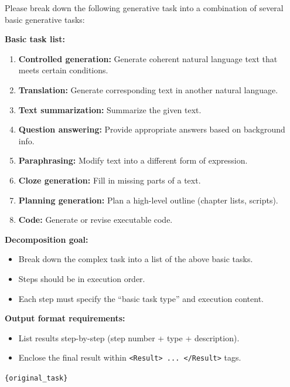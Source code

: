 \begin{tcolorbox}[title={\texttt{TASK\_DECOMP\_PROMPT}}, breakable, colframe=blue!50!black, colback=blue!5]
Please break down the following generative task into a combination of several basic generative tasks:

\textbf{Basic task list:}
\begin{enumerate}
    \item \textbf{Controlled generation:} Generate coherent natural language text that meets certain conditions.
    \item \textbf{Translation:} Generate corresponding text in another natural language.
    \item \textbf{Text summarization:} Summarize the given text.
    \item \textbf{Question answering:} Provide appropriate answers based on background info.
    \item \textbf{Paraphrasing:} Modify text into a different form of expression.
    \item \textbf{Cloze generation:} Fill in missing parts of a text.
    \item \textbf{Planning generation:} Plan a high-level outline (chapter lists, scripts).
    \item \textbf{Code:} Generate or revise executable code.
\end{enumerate}

\textbf{Decomposition goal:}
\begin{itemize}
    \item Break down the complex task into a list of the above basic tasks.
    \item Steps should be in execution order.
    \item Each step must specify the ``basic task type'' and execution content.
\end{itemize}

\textbf{Output format requirements:}
\begin{itemize}
    \item List results step-by-step (step number + type + description).
    \item Enclose the final result within \texttt{<Result> ... </Result>} tags.
\end{itemize}

\bigskip
\texttt{\{original\_task\}}
\end{tcolorbox}

